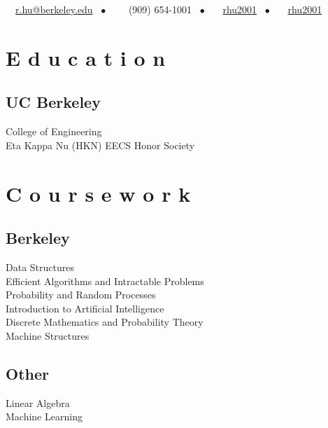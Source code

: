 \documentclass[]{deedy-resume-openfont}
\begin{document}
%
%
{\faEnvelope \ \ \href{mailto:r.hu@berkeley.edu}{r.hu@berkeley.edu} \ \(\bullet\) \ \ \faPhone \ \ (909)  654-1001 \ \(\bullet\) \ \faGithub \ \ \href{https://github.com/rhu2001}{rhu2001} \ \(\bullet\) \ \faLinkedin \ \ \href{https://www.linkedin.com/in/rhu2001/}{rhu2001}}

%
%

\begin{minipage}[t]{0.33\textwidth} 


\section{E d u c a t i o n} 

\subsection{UC Berkeley}
College of Engineering \\
Eta Kappa Nu (HKN) EECS Honor Society
\sectionsep


\section{C o u r s e w o r k}

\subsection{Berkeley}
Data Structures \\
Efficient Algorithms and Intractable Problems \\
Probability and Random Processes \\
Introduction to Artificial Intelligence \\
Discrete Mathematics and Probability Theory \\
Machine Structures \\
\subsection{Other}
Linear Algebra \\
Machine Learning \\
\sectionsep


\end{minipage}
\end{document}
